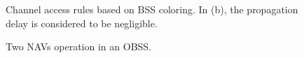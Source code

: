\documentclass{article}
\begin{document}
\begin{figure}[ht!]
	\centering
	\caption{Channel access rules based on BSS coloring. In (b), the propagation delay is considered to be negligible.}
\end{figure}

\begin{figure}[ht!]
	\centering
	\hspace{1cm}
	\caption{Two NAVs operation in an OBSS.}
	\label{fig:two_navs}
\end{figure}
\end{document}
